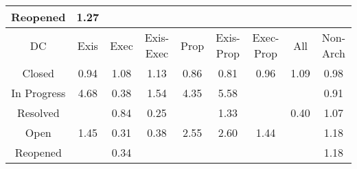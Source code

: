 \begin{tabular}{|c||c|c|c|c|c|c|c|c|}
\hline
Reopened & \cellcolor[rgb]{0.9012776109015382,0.8358683420059917,0.41999999999999993} 1.27 &  &  &  &  &  &  &  \\ 
\hline
\hline
DC & Exis & Exec & Exis-Exec & Prop & Exis-Prop & Exec-Prop & All & Non-Arch \\ 
\hline
Closed & \cellcolor[rgb]{0.8979447186447789,0.7829383349186196,0.4087484040684602} 0.94 & \cellcolor[rgb]{0.9075656679604588,0.8388468953496909,0.42} 1.08 & \cellcolor[rgb]{0.9058387097577705,0.8380288625168386,0.42} 1.13 & \cellcolor[rgb]{0.8825528530894361,0.7100835046233306,0.3943826628834736} 0.86 & \cellcolor[rgb]{0.872102592665962,0.6606189386188868,0.3846290864882312} 0.81 & \cellcolor[rgb]{0.9017497074811471,0.8009486154107626,0.41229972698240386} 0.96 & \cellcolor[rgb]{0.9071098166405827,0.838630965777118,0.42} 1.09 & \cellcolor[rgb]{0.905977326239031,0.8209593441980804,0.41624550448976233} 0.98 \\ 
\hline
In Progress & \cellcolor[rgb]{0.7907942750059773,0.7835341302659893,0.42000000000000004} 4.68 & \cellcolor[rgb]{0.7854673147895894,0.25054529000405623,0.30376949380361673} 0.38 & \cellcolor[rgb]{0.8924709187310885,0.8316967509778841,0.42} 1.54 & \cellcolor[rgb]{0.801518252866813,0.7886139092527008,0.42} 4.35 & \cellcolor[rgb]{0.7616423261670929,0.7697253123949388,0.42000000000000004} 5.58 &  &  & \cellcolor[rgb]{0.8914257386805802,0.7520818297547458,0.4026640227685414} 0.91 \\ 
\hline
Resolved &  & \cellcolor[rgb]{0.8786183843123376,0.6914603524117318,0.39071049202484853} 0.84 & \cellcolor[rgb]{0.76,0.13,0.28} 0.25 &  & \cellcolor[rgb]{0.8994127486817743,0.8349849862176825,0.42} 1.33 &  & \cellcolor[rgb]{0.7907236422890918,0.27542524016836745,0.3086753994698189} 0.40 & \cellcolor[rgb]{0.9078894201270965,0.8390002516391509,0.42} 1.07 \\ 
\hline
Open & \cellcolor[rgb]{0.8954311032355514,0.8330989436378928,0.42} 1.45 & \cellcolor[rgb]{0.7720699360491577,0.18713103063268,0.2912652736458806} 0.31 & \cellcolor[rgb]{0.7861016337281677,0.2535477329799932,0.3043615248129564} 0.38 & \cellcolor[rgb]{0.8598681221940554,0.8162533210392894,0.42} 2.55 & \cellcolor[rgb]{0.8580810923407275,0.8154068332140287,0.42} 2.60 & \cellcolor[rgb]{0.8957835313277317,0.8332658832605045,0.42} 1.44 &  & \cellcolor[rgb]{0.904301117202328,0.8373005292011027,0.42} 1.18 \\ 
\hline
Reopened &  & \cellcolor[rgb]{0.7788864711433672,0.21939596341193823,0.29762737306714276} 0.34 &  &  &  &  &  & \cellcolor[rgb]{0.9043136326628478,0.8373064575771384,0.42} 1.18 \\ 

\end{tabular}
